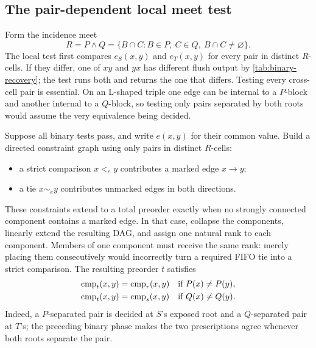 \subsection{The pair-dependent local meet test}
\label{sec:eta-local}

Form the incidence meet
\begin{equation}
 R=P\wedge Q
   =\{B\cap C:B\in P,\ C\in Q,\ B\cap C\ne\varnothing\}.
 \label{eq:eta-meet}
\end{equation}
The local test first compares \(e_S(x,y)\) and \(e_T(x,y)\) for every pair in
distinct \(R\)-cells.  If they differ, one of \(xy\) and \(yx\) has different
flush output by \autoref{tab:binary-recovery}; the test runs both and returns the
one that differs.  Testing every cross-cell pair is essential.  On an
L-shaped triple one edge can be internal to a \(P\)-block and another internal
to a \(Q\)-block, so testing only pairs separated by both roots would assume
the very equivalence being decided.

Suppose all binary tests pass, and write \(e(x,y)\) for their common value.
Build a directed constraint graph using only pairs in distinct \(R\)-cells:
\begin{itemize}
\item a strict comparison \(x<_e y\) contributes a marked edge
      \(x\to y\);
\item a tie \(x\sim_e y\) contributes unmarked edges in both directions.
\end{itemize}
These constraints extend to a total preorder exactly when no strongly
connected component contains a marked edge.  In that case, collapse the
components, linearly extend the resulting DAG, and assign one natural rank to
each component.  Members of one component must receive the same rank: merely
placing them consecutively would incorrectly turn a required FIFO tie into a
strict comparison.  The resulting preorder \(t\) satisfies
\begin{equation}
 \begin{aligned}
  \operatorname{cmp}_t(x,y)&=\operatorname{cmp}_r(x,y)
    &&\text{if }P(x)\ne P(y),\\
  \operatorname{cmp}_t(x,y)&=\operatorname{cmp}_s(x,y)
    &&\text{if }Q(x)\ne Q(y).
 \end{aligned}
 \label{eq:eta-root-compatibility}
\end{equation}
Indeed, a \(P\)-separated pair is decided at \(S\)'s exposed root and a
\(Q\)-separated pair at \(T\)'s; the preceding binary phase makes the two
prescriptions agree whenever both roots separate the pair.

